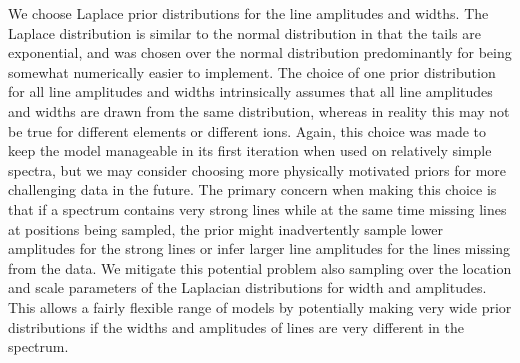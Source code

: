 \documentclass[12pt]{emulateapj}
\begin{document}
We choose Laplace prior distributions for the line amplitudes and widths. The Laplace distribution is similar to the normal distribution in that the tails are exponential, and was chosen over the normal distribution predominantly for being somewhat numerically easier to implement. The choice of one prior distribution for all line amplitudes and widths intrinsically assumes that all line amplitudes and widths are drawn from the same distribution, whereas in reality this may not be true for different elements or different ions. Again, this choice was made to keep the model manageable in its first iteration when used on relatively simple spectra, but we may consider choosing more physically motivated priors for more challenging data in the future.
The primary concern when making this choice is that if a spectrum contains very strong lines while at the same time missing lines at positions being sampled, the prior might inadvertently sample lower amplitudes for the strong lines or infer larger line amplitudes for the lines missing from the data.
We mitigate this potential problem also sampling over the location and scale parameters of the Laplacian distributions for width and amplitudes. This allows a fairly flexible range of models by potentially making very wide prior distributions if the widths and amplitudes of lines are very different in the spectrum.
\end{document}
